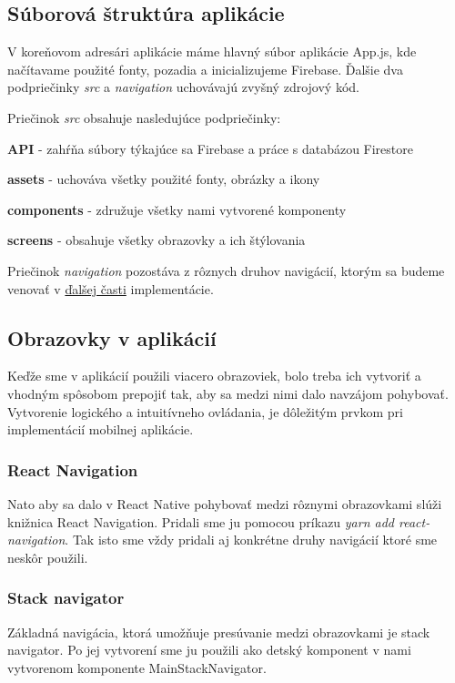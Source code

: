 \subsection{Súborová štruktúra aplikácie}
V koreňovom adresári aplikácie máme hlavný súbor aplikácie App.js, kde načítavame použité fonty, pozadia a inicializujeme Firebase. Ďalšie dva podpriečinky \textit{src} a \textit{navigation} uchovávajú zvyšný zdrojový kód. 

Priečinok \textit{src} obsahuje nasledujúce podpriečinky:
\begin{itemize}
{\item \textbf{API} - zahŕňa súbory týkajúce sa Firebase a práce s databázou Firestore} 
{\item \textbf{assets} - uchováva všetky použité fonty, obrázky a ikony} 
{\item \textbf{components} - združuje všetky nami vytvorené komponenty} 
{\item \textbf{screens} - obsahuje všetky obrazovky a ich štýlovania}
\end{itemize}

Priečinok \textit{navigation} pozostáva z rôznych druhov navigácií, ktorým sa budeme venovať v \hyperref[sec:screens]{ďalšej časti} implementácie.

\subsection{Obrazovky v aplikácií}
\label{sec:screens}
Keďže sme v aplikácií použili viacero obrazoviek, bolo treba ich vytvoriť a vhodným spôsobom prepojiť tak, aby sa medzi nimi dalo navzájom pohybovať. Vytvorenie logického a intuitívneho ovládania, je dôležitým prvkom pri implementácií mobilnej aplikácie.
\subsubsection{React Navigation}
Nato aby sa dalo v React Native pohybovať medzi rôznymi obrazovkami slúži knižnica React Navigation. Pridali sme ju pomocou príkazu \textit{yarn add react-navigation}. Tak isto sme vždy pridali aj konkrétne druhy navigácií ktoré sme neskôr použili.
\subsubsection{Stack navigator}
Základná navigácia, ktorá umožňuje presúvanie medzi obrazovkami je stack navigator. Po jej vytvorení sme ju použili ako detský komponent v nami vytvorenom komponente MainStackNavigator. 

